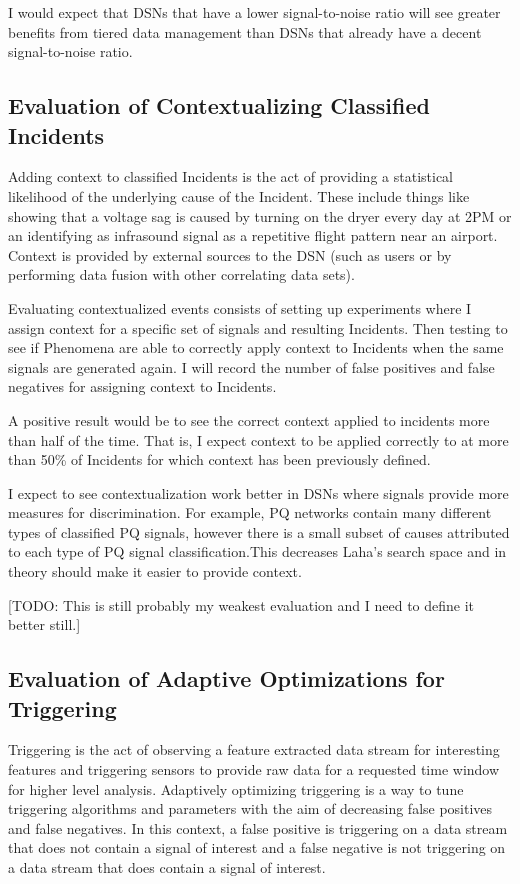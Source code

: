 I would expect that DSNs that have a lower signal-to-noise ratio will see greater benefits from tiered data management than DSNs that already have a decent signal-to-noise ratio.

\subsection{Evaluation of Contextualizing Classified Incidents}
Adding context to classified Incidents is the act of providing a statistical likelihood of the underlying cause of the Incident. These include things like showing that a voltage sag is caused by turning on the dryer every day at 2PM or an identifying as infrasound signal as a repetitive flight pattern near an airport. Context is provided by external sources to the DSN (such as users or by performing data fusion with other correlating data sets).

Evaluating contextualized events consists of setting up experiments where I assign context for a specific set of signals and resulting Incidents. Then testing to see if Phenomena are able to correctly apply context to Incidents when the same signals are generated again. I will record the number of false positives and false negatives for assigning context to Incidents.

A positive result would be to see the correct context applied to incidents more than half of the time. That is, I expect context to be applied correctly to at more than 50\% of Incidents for which context has been previously defined.

I expect to see contextualization work better in DSNs where signals provide more measures for discrimination. For example, PQ networks contain many different types of classified PQ signals, however there is a small subset of causes attributed to each type of PQ signal classification.This decreases Laha's search space and in theory should make it easier to provide context.

[TODO: This is still probably my weakest evaluation and I need to define it better still.]

\subsection{Evaluation of Adaptive Optimizations for Triggering}
Triggering is the act of observing a feature extracted data stream for interesting features and triggering sensors to provide raw data for a requested time window for higher level analysis. Adaptively optimizing triggering is a way to tune triggering algorithms and parameters with the aim of decreasing false positives and false negatives. In this context, a false positive is triggering on a data stream that does not contain a signal of interest and a false negative is not triggering on a data stream that does contain a signal of interest. 

